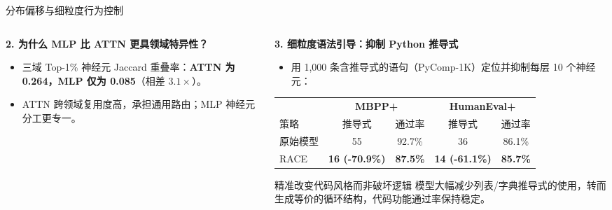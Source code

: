 \documentclass{beamer}
\begin{document}
\begin{frame}{分布偏移与细粒度行为控制}
\begin{columns}[T]
\begin{column}{0.47\textwidth}
            \vspace{0.1em}
            \textbf{2. 为什么 MLP 比 ATTN 更具领域特异性？}
            \begin{itemize}\scriptsize
                \item 三域 Top-1\% 神经元 Jaccard 重叠率：\textbf{ATTN 为 0.264，MLP 仅为 0.085}（相差 $3.1\times$）。
                \item ATTN 跨领域复用度高，承担通用路由；MLP 神经元分工更专一。
            \end{itemize}
        \end{column}
        \begin{column}{0.49\textwidth}
            \footnotesize
            \textbf{3. 细粒度语法引导：抑制 Python 推导式}
            \begin{itemize}\scriptsize
                \item 用 1,000 条含推导式的语句（PyComp-1K）定位并抑制每层 10 个神经元：
            \end{itemize}
            \begin{center}
            \scriptsize
            \setlength{\tabcolsep}{3.5pt}
            \begin{tabular}{l|cc|cc}
                \toprule
                & \multicolumn{2}{c|}{\textbf{MBPP+}} & \multicolumn{2}{c}{\textbf{HumanEval+}} \\
                策略 & 推导式 & 通过率 & 推导式 & 通过率 \\
                \midrule
                原始模型 & 55 & 92.7\% & 36 & 86.1\% \\
                RACE & \alert{\textbf{16 (-70.9\%)}} & \textbf{87.5\%} & \alert{\textbf{14 (-61.1\%)}} & \textbf{85.7\%} \\
                \bottomrule
            \end{tabular}
            \end{center}
            \begin{alertblock}{精准改变代码风格而非破坏逻辑}\scriptsize
                模型大幅减少列表/字典推导式的使用，转而生成等价的循环结构，代码功能通过率保持稳定。
            \end{alertblock}
        \end{column}
    \end{columns}
\end{frame}
\end{document}
